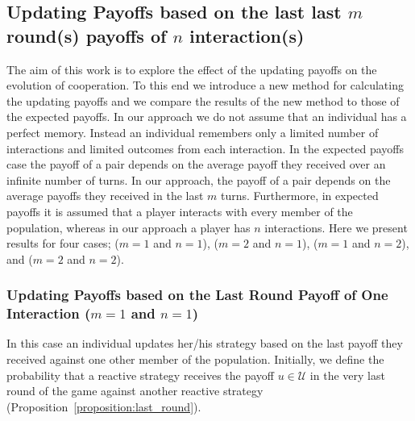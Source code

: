 \documentclass[11pt]{article}
\theoremstyle{plainCl1}
\theoremstyle{plainCl2}
\begin{document}
\subsection{Updating Payoffs based on the last last \(m\) round(s) payoffs of \(n\) interaction(s)}

The aim of this work is to explore the effect of the updating payoffs on the
evolution of cooperation. To this end we introduce a new method for calculating
the updating payoffs and we compare the results of the new method to those of
the expected payoffs. In our approach we do not assume that an individual has a
perfect memory. Instead an individual remembers only a limited number of
interactions and limited outcomes from each interaction. In the expected payoffs
case the payoff of a pair depends on the average payoff they received over an
infinite number of turns. In our approach, the payoff of a pair depends on the
average payoffs they received in the last \(m\) turns. Furthermore, in expected
payoffs it is assumed that a player interacts with every member of the
population, whereas in our approach a player has \(n\) interactions.  Here we
present results for four cases; (\(m=1\) and \(n=1\)), (\(m=2\) and \(n=1\)),
(\(m=1\) and \(n=2\)), and (\(m=2\) and \(n=2\)).

\subsubsection{Updating Payoffs based on the Last Round Payoff of One Interaction (\(m=1\) and \(n=1\))}\label{section:m_one_n_one}

In this case an individual updates her/his strategy based on the last payoff
they received against one other member of the population. Initially, we define
the probability that a reactive strategy receives the payoff $u\!\in\!
\mathcal{U}$ in the very last round of the game against another reactive
strategy (Proposition~\ref{proposition:last_round}).
\end{document}
